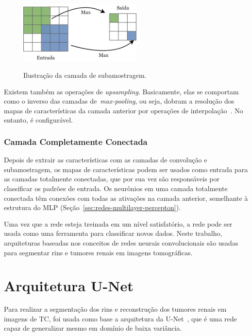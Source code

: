 \begin{figure}[!ht]
    \centering
    \caption{Ilustração da camada de subamostragem.}
    \includegraphics[width=0.55\textwidth]{figuras/camada-subamostragem2.png}
    \label{fig:camada-subamostragem}
\end{figure}

Existem também as operações de \textit{upsampling}. Basicamente, elas se comportam como o inverso das camadas de~\textit{max-pooling}, ou seja, dobram a resolução dos mapas de características da camada anterior por operações de interpolação~\cite{long2015fully}. No entanto, é configurável.

\subsubsection{Camada Completamente Conectada}
\label{sec:camada-completamente-conectada}

Depois de extrair as características com as camadas de convolução e subamostragem, os mapas de características podem ser usados como entrada para as camadas totalmente conectadas, que por sua vez são responsáveis por classificar os padrões de entrada. Os neurônios em uma camada totalmente conectada têm conexões com todas as ativações na camada anterior, semelhante à estrutura do MLP (Seção~\ref{sec:redes-multilayer-percepton}).

Uma vez que a rede esteja treinada em um nível satisfatório, a rede pode ser usada como uma ferramenta para classificar novos dados. Neste trabalho, arquiteturas baseadas nos conceitos de redes neurais convolucionais são usadas para segmentar rins e tumores renais em imagens tomográficas.

\section{Arquitetura U-Net}
\label{sec:arquitetura-unet}

Para realizar a segmentação dos rins e reconstrução dos tumores renais em imagens de TC, foi usada como base a arquitetura da U-Net~\cite{He7780459}, que é uma rede capaz de generalizar mesmo em domínio de baixa variância.

